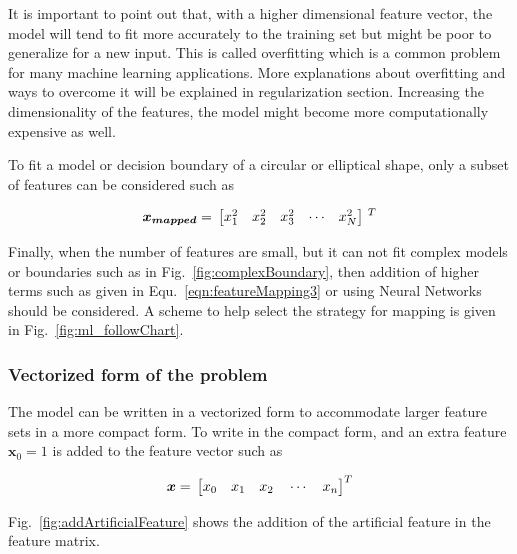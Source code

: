 It is important to point out that, with a higher dimensional feature vector, the model will tend to fit more accurately to the training set but might be poor to generalize for a new input. 
This is called overfitting which is a common problem for many machine learning applications. 
More explanations about overfitting and ways to overcome it will be explained in regularization section. 
Increasing the dimensionality of the features, the model might become more computationally expensive as well.

To fit a model or decision boundary of a circular or elliptical shape, only a subset of features can be considered such as

\begin{equation}{\label{eqn:featureMappin54}}
\bm{x_{mapped}}
=\,
\begin{bmatrix}
x_1^2 & x_2^2 & x_3^2 & \cdots & x_N^2  
\end{bmatrix}
\,^ T
\end{equation} 

Finally, when the number of features are small, but it can not fit complex models or boundaries such as in Fig.~\ref{fig:complexBoundary}, then addition of higher terms such as given in 
Equ.~\ref{eqn:featureMapping3} or using Neural Networks should be considered.
A scheme to help select the strategy for mapping is given in  Fig.~\ref{fig:ml_followChart}. 

\subsubsection{Vectorized form of the problem}

The model can be written in a vectorized form to accommodate larger feature sets in a more compact form.
To write in the compact form, and an extra feature $\bm{x}_0 = 1$ is added to the feature vector such as

\begin{equation}{\label{eqn:featureVector}}
\bm{x}
=\,
\begin{bmatrix}
x_0 \quad x_1 \quad x_2 \quad \cdots \quad x_n 
\end{bmatrix}
^T
\end{equation} 

 Fig.~\ref{fig:addArtificialFeature} shows the addition of the artificial feature in the feature matrix.

